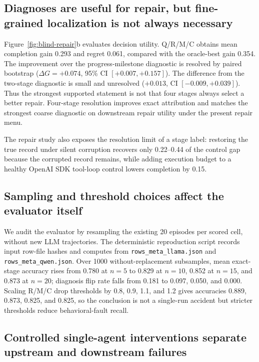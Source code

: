 \documentclass{article}
\newcommand{\qrmc}{Q/R/M/C}
\begin{document}
\subsection{Diagnoses are useful for repair, but fine-grained localization is not always necessary}

Figure~\ref{fig:blind-repair}b evaluates decision utility. \qrmc{} obtains mean completion gain 0.293 and regret 0.061, compared with the oracle-best gain 0.354. The improvement over the progress-milestone diagnostic is resolved by paired bootstrap ($\Delta G=+0.074$, 95\% CI $[+0.007,+0.157]$). The difference from the two-stage diagnostic is small and unresolved ($+0.013$, CI $[-0.009,+0.039]$). Thus the strongest supported statement is not that four stages always select a better repair. Four-stage resolution improves exact attribution and matches the strongest coarse diagnostic on downstream repair utility under the present repair menu.

The repair study also exposes the resolution limit of a stage label: restoring the true record under silent corruption recovers only 0.22--0.44 of the control gap because the corrupted record remains, while adding execution budget to a healthy OpenAI SDK tool-loop control lowers completion by 0.15.

\subsection{Sampling and threshold choices affect the evaluator itself}

We audit the evaluator by resampling the existing 20 episodes per scored cell, without new LLM trajectories. The deterministic reproduction script records input row-file hashes and computes from \texttt{rows\_meta\_llama.json} and \texttt{rows\_meta\_qwen.json}. Over 1000 without-replacement subsamples, mean exact-stage accuracy rises from 0.780 at $n=5$ to 0.829 at $n=10$, 0.852 at $n=15$, and 0.873 at $n=20$; diagnosis flip rate falls from 0.181 to 0.097, 0.050, and 0.000. Scaling R/M/C drop thresholds by 0.8, 0.9, 1.1, and 1.2 gives accuracies 0.889, 0.873, 0.825, and 0.825, so the conclusion is not a single-run accident but stricter thresholds reduce behavioral-fault recall.

\subsection{Controlled single-agent interventions separate upstream and downstream failures}
\end{document}
